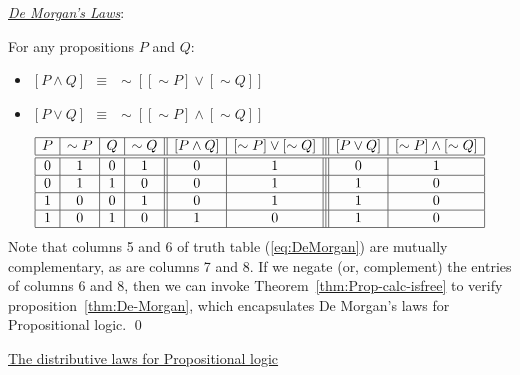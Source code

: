 \bigskip

\noindent 
\underline{\it De Morgan's Laws}:

\begin{prop}
\label{thm:De-Morgan}
For any propositions $P$ and $Q$:
\begin{itemize}
\item
$[ P \wedge Q ] \ \ \equiv \ \ \sim [ [\sim P] \vee [\sim Q]]$
\item
$[ P \vee Q ] \ \ \equiv \ \ \sim [ [\sim P] \wedge [\sim Q]]$
\end{itemize}
\end{prop}

\begin{equation}
\label{eq:DeMorgan}
\begin{array}{|c|c|c|c||c|c|||c|c|}
\hline
P & \sim P & Q & \sim Q 
  & [ P \wedge Q ]
  & [\sim P] \vee [\sim Q]
  & [ P \vee Q ]
  & [\sim P] \wedge [\sim Q] \\
\hline
\hline
0 & 1 & 0 & 1
  & 0
  & 1
  & 0
  & 1 \\
\hline
0 & 1 & 1 & 0
  & 0
  & 1
  & 1
  & 0 \\
\hline
1 & 0 & 0 & 1
  & 0
  & 1
  & 1
  & 0 \\
\hline
1 & 0 & 1 & 0
  & 1
  & 0
  & 1
  & 0 \\
\hline
\end{array}
\end{equation}
Note that columns 5 and 6 of truth table (\ref{eq:DeMorgan}) are
mutually complementary, as are columns 7 and 8.  If we negate (or,
complement) the entries of columns 6 and 8, then we can invoke
Theorem~\ref{thm:Prop-calc-isfree} to verify
proposition~\ref{thm:De-Morgan}, which encapsulates De Morgan's laws
for Propositional logic.  \qed

\medskip

\noindent 
\underline{\small\sf The distributive laws for Propositional logic}


